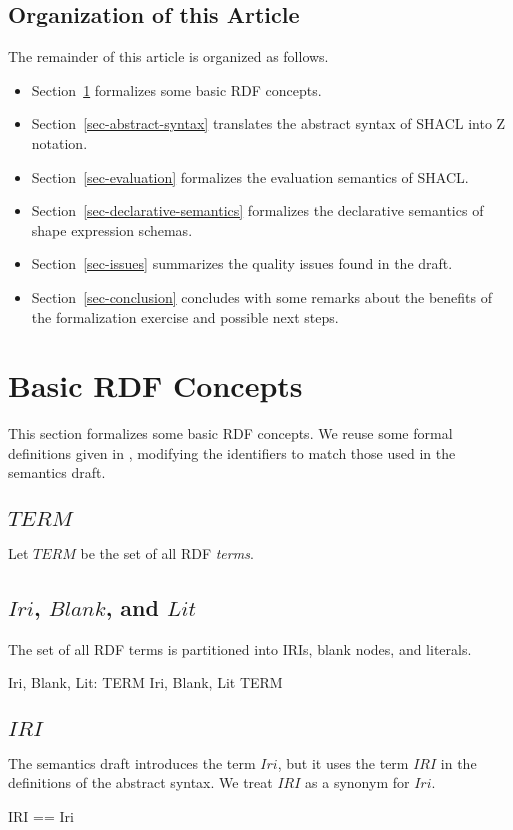 \documentclass{article}
\begin{document}
\subsection{Organization of this Article}
The remainder of this article is organized as follows.
\begin{itemize}
\item Section~\ref{sec-basic-rdf-concepts} formalizes some basic RDF concepts.
\item Section~\ref{sec-abstract-syntax} translates the abstract syntax of SHACL into Z notation.
\item Section~\ref{sec-evaluation} formalizes the evaluation semantics of SHACL.
\item Section~\ref{sec-declarative-semantics} formalizes the declarative semantics of shape expression schemas.
\item Section~\ref{sec-issues} summarizes the quality issues found in the draft.
\item Section~\ref{sec-conclusion} concludes with some remarks about the benefits of the formalization exercise and 
possible next steps.
\end{itemize}

\section{Basic RDF Concepts}
\label{sec-basic-rdf-concepts}
This section formalizes some basic RDF concepts.
We reuse some formal definitions given in \cite{arthur:recursion}, modifying the identifiers to match those used in the semantics draft.

\subsection{$TERM$}
Let $TERM$ be the set of all RDF {\em terms}.
\begin{zed}
	[TERM]
\end{zed}

\subsection{$Iri$, $Blank$, and $Lit$}
The set of all RDF terms is partitioned into IRIs, blank nodes, and literals.
\begin{axdef}
	Iri, Blank, Lit: \power TERM
\where
	\langle Iri, Blank, Lit \rangle \partition TERM
\end{axdef}

\subsection{$IRI$}
The semantics draft introduces the term $Iri$, but it uses the term $IRI$ in the definitions of the abstract syntax.
We treat $IRI$ as a synonym for $Iri$.
\begin{zed}
	IRI == Iri
\end{zed}
\end{document}
